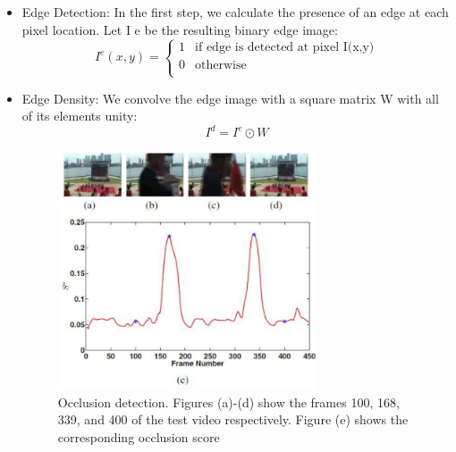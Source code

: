 \documentclass{sig-alternate-05-2015}
\begin{document}
\begin{itemize}
    \item Edge Detection: In the first step, we calculate the presence of an edge at each pixel location. Let I e be the resulting binary edge image:\\
\begin{equation}
I^e(x,y) = \left\{\begin{array}{ll}
    1 & \text{if edge is detected at pixel I(x,y)}\\
    0 & \text{otherwise}\\
    \end{array}\right.
\end{equation}
    \item Edge Density: We convolve the edge image with a square
matrix W with all of its elements unity:
\begin{equation}
    I^d=I^e\odot W
\end{equation}

\begin{figure}
\centering
\includegraphics[width=1\linewidth,height=200pt]{video.pdf}
\caption{Occlusion detection. Figures (a)-(d) show the frames
100, 168, 339, and 400 of the test video respectively. Figure (e)
shows the corresponding occlusion score}
\end{figure}


\end{itemize}
\end{document}
